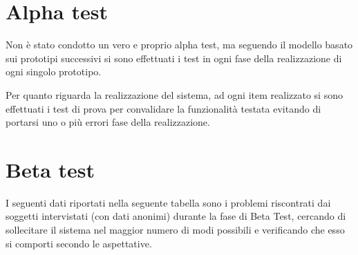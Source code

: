 \section{Alpha test}\label{sec:alpha-test}
Non è stato condotto un vero e proprio alpha test, ma seguendo il modello 
basato sui prototipi successivi si sono effettuati i test in ogni fase della 
realizzazione di ogni singolo prototipo.

Per quanto riguarda la realizzazione del sistema, ad ogni item realizzato si 
sono effettuati i test di prova per convalidare la funzionalità testata 
evitando di portarsi uno o più errori fase della realizzazione.

\section{Beta test}
I seguenti dati riportati nella seguente tabella sono i problemi riscontrati 
dai soggetti intervistati (con dati anonimi) durante la fase di Beta Test, 
cercando di sollecitare il sistema nel maggior numero di modi possibili e 
verificando che esso si comporti secondo le aspettative.

\begin{table}[H]
\end{table}


